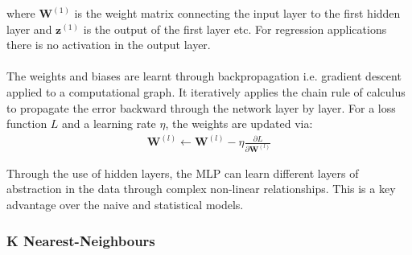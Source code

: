 \documentclass[12pt,twoside]{report}
\begin{document}
where \(\mathbf{W}^{(1)}\) is the weight matrix connecting the input layer to the first hidden layer and \(\mathbf{z}^{(1)}\) is the output of the first layer etc. For regression applications there is no activation in the output layer. 
\\\\
The weights and biases are learnt through backpropagation i.e. gradient descent applied to a computational graph. It iteratively applies the chain rule of calculus to propagate the error backward through the network layer by layer. For a loss function $L$ and a learning rate $\eta$, the weights are updated via:
\begin{align}
    \mathbf{W}^{(l)} \leftarrow \mathbf{W}^{(l)} - \eta \frac{\partial L}{\partial \mathbf{W}^{(l)}}
\end{align}

Through the use of hidden layers, the MLP can learn different layers of abstraction in the data through complex non-linear relationships. This is a key advantage over the naive and statistical models.  

\subsubsection{K Nearest-Neighbours}
\end{document}
